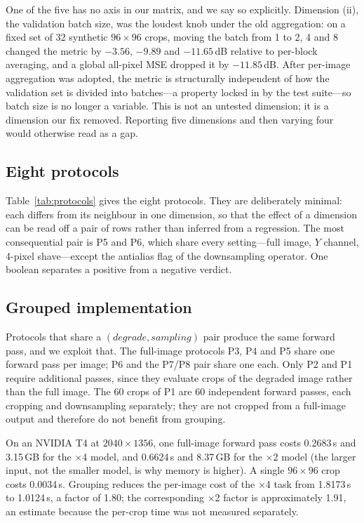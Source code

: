 \documentclass[10pt,twocolumn]{article}
\begin{document}
One of the five has no axis in our matrix, and we say so explicitly.
Dimension (ii), the validation batch size, was the loudest knob under the
old aggregation: on a fixed set of 32 synthetic $96\times96$ crops, moving
the batch from 1 to 2, 4 and 8 changed the metric by $-3.56$, $-9.89$ and
$-11.65$\,dB relative to per-block averaging, and a global all-pixel MSE
dropped it by $-11.85$\,dB. After per-image aggregation was adopted, the
metric is structurally independent of how the validation set is divided into
batches---a property locked in by the test suite---so batch size is no
longer a variable. This is not an untested dimension; it is a dimension our
fix removed. Reporting five dimensions and then varying four would
otherwise read as a gap.

\subsection{Eight protocols}

Table~\ref{tab:protocols} gives the eight protocols. They are deliberately
minimal: each differs from its neighbour in one dimension, so that the
effect of a dimension can be read off a pair of rows rather than inferred
from a regression. The most consequential pair is P5 and P6, which share
every setting---full image, $Y$ channel, 4-pixel shave---except the
antialias flag of the downsampling operator. One boolean separates a
positive from a negative verdict.



\subsection{Grouped implementation}

Protocols that share a $(degrade, sampling)$ pair produce the same forward
pass, and we exploit that. The full-image protocols P3, P4 and P5 share one
forward pass per image; P6 and the P7/P8 pair share one each. Only P2 and P1
require additional passes, since they evaluate crops of the degraded image
rather than the full image. The 60 crops of P1 are 60 independent forward
passes, each cropping and downsampling separately; they are not cropped
from a full-image output and therefore do not benefit from grouping.

On an NVIDIA T4 at $2040\times1356$, one full-image forward pass costs
0.2683\,s and 3.15\,GB for the $\times$4 model, and 0.6624\,s and 8.37\,GB
for the $\times$2 model (the larger input, not the smaller model, is why
memory is higher). A single $96\times96$ crop costs 0.0034\,s. Grouping
reduces the per-image cost of the $\times$4 task from 1.8173\,s to
1.0124\,s, a factor of 1.80; the corresponding $\times$2 factor is
approximately 1.91, an estimate because the per-crop time was not
measured separately.
\end{document}

